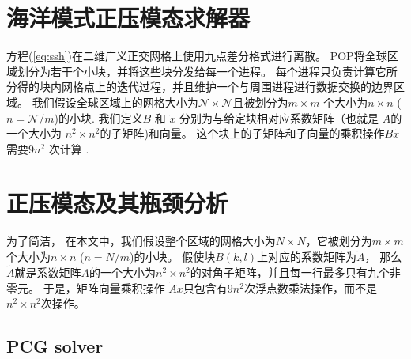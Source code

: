 \section{海洋模式正压模态求解器}
\label{sec:baro1}


方程(\ref{eq:ssh})在二维广义正交网格上使用九点差分格式进行离散。  
POP将全球区域划分为若干个小块，并将这些块分发给每一个进程。
每个进程只负责计算它所分得的块内网格点上的迭代过程，并且维护一个与周围进程进行数据交换的边界区域。 
我们假设全球区域上的网格大小为$\mathcal{N}\times
\mathcal{N}$且被划分为$m\times m$ 个大小为$n\times n$ ($n=\mathcal{N}/m$)的小块.
我们定义$B$ 和 $\tilde{x}$ 分别为与给定块相对应系数矩阵（也就是 $A$的一个大小为 $n^2\times n^2$的子矩阵)和向量。
这个块上的子矩阵和子向量的乘积操作$B\tilde{x}$ 需要$9n^2$ 次计算 \cite{hu2013scalable}.

\section{正压模态及其瓶颈分析} \label{se:baro}


为了简洁， 在本文中，我们假设整个区域的网格大小为$N\times N$，它被划分为$m\times m$个大小为$n\times n$ ($n=N/m$)的小块。 
假使块$B(k,l)$上对应的系数矩阵为$\tilde{A}$， 那么$\tilde{A}$就是系数矩阵$A$的一个大小为$n^2\times n^2$的对角子矩阵，并且每一行最多只有九个非零元。 
于是，矩阵向量乘积操作 $\tilde{A}\tilde{x}$只包含有$9n^2$次浮点数乘法操作，而不是$n^2\times n^2$次操作。 

\subsection{PCG solver }
 
